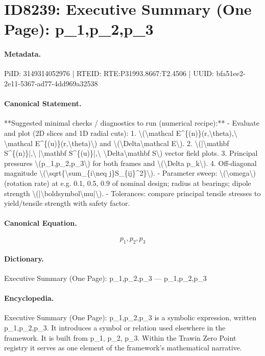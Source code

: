 \section*{ID8239: Executive Summary (One Page): p\_1,p\_2,p\_3}
\paragraph{Metadata.}
PiID: 3149314052976 | RTEID: RTE:P31993.8667:T2.4506 | UUID: bfa51ee2-2e11-5367-ad77-4dd969a32538

\paragraph{Canonical Statement.}
**Suggested minimal checks / diagnostics to run (numerical recipe):** - Evaluate and plot (2D slices and 1D radial cuts): 1. \textbackslash{}(\textbackslash{}mathcal E\textasciicircum{}\{(n)\}(r,\textbackslash{}theta),\textbackslash{} \textbackslash{}mathcal E\textasciicircum{}\{(u)\}(r,\textbackslash{}theta)\textbackslash{}) and \textbackslash{}(\textbackslash{}Delta\textbackslash{}mathcal E\textbackslash{}). 2. \textbackslash{}(|\textbackslash{}mathbf S\textasciicircum{}\{(n)\}|,\textbackslash{} |\textbackslash{}mathbf S\textasciicircum{}\{(u)\}|,\textbackslash{} \textbackslash{}Delta\textbackslash{}mathbf S\textbackslash{}) vector field plots. 3. Principal pressures \textbackslash{}(p\_1,p\_2,p\_3\textbackslash{}) for both frames and \textbackslash{}(\textbackslash{}Delta p\_k\textbackslash{}). 4. Off-diagonal magnitude \textbackslash{}(\textbackslash{}sqrt\{\textbackslash{}sum\_\{i\textbackslash{}neq j\}S\_\{ij\}\textasciicircum{}2\}\textbackslash{}). - Parameter sweep: \textbackslash{}(\textbackslash{}omega\textbackslash{}) (rotation rate) at e.g. 0.1, 0.5, 0.9 of nominal design; radius at bearings; dipole strength \textbackslash{}(|\textbackslash{}boldsymbol\textbackslash{}mu|\textbackslash{}). - Tolerances: compare principal tensile stresses to yield/tensile strength with safety factor.

\paragraph{Canonical Equation.}
\[
p_1,p_2,p_3
\]

\paragraph{Dictionary.}
Executive Summary (One Page): p\_1,p\_2,p\_3 — p\_1,p\_2,p\_3

\paragraph{Encyclopedia.}
Executive Summary (One Page): p\_1,p\_2,p\_3 is a symbolic expression, written p\_1,p\_2,p\_3. It introduces a symbol or relation used elsewhere in the framework. It is built from p\_1, p\_2, p\_3. Within the Trawin Zero Point registry it serves as one element of the framework's mathematical narrative.
